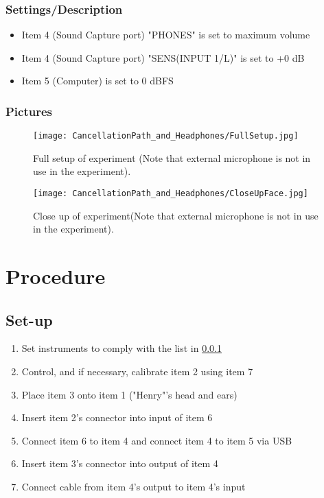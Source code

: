 \subsubsection{Settings/Description}
\label{SettingsCacellationPath}

\begin{itemize}
	\item Item 4 (Sound Capture port) "PHONES" is set to maximum volume
	\item Item 4 (Sound Capture port) "SENS(INPUT 1/L)" is set to +0 dB		
	\item Item 5 (Computer) is set to 0 dBFS
\end{itemize}


\subsubsection{Pictures}
\begin{figure}[H]
	\centering
	\texttt{[image: CancellationPath\_and\_Headphones/FullSetup.jpg]}
	\caption{Full setup of experiment (Note that external microphone is not in use in the experiment).}
	\label{FullSetupCancellationPath}
\end{figure}

\begin{figure}[H]
	\centering
	\texttt{[image: CancellationPath\_and\_Headphones/CloseUpFace.jpg]}
	\caption{Close up of experiment(Note that external microphone is not in use in the experiment).}
	\label{CloseUpCancellationPath}
\end{figure}

\section{Procedure}
\subsection{Set-up}
\begin{enumerate}
	\item Set instruments to comply with the list in \ref{SettingsCacellationPath}
	\item Control, and if necessary, calibrate item 2 using item 7
	\item Place item 3 onto item 1 ("Henry"'s head and ears)
	\item Insert item 2's connector into input of item 6
	\item Connect item 6 to item 4 and connect item 4 to item 5 via USB
	\item Insert item 3's connector into output of item 4
	\item Connect cable from item 4's output to item 4's input
\end{enumerate}

